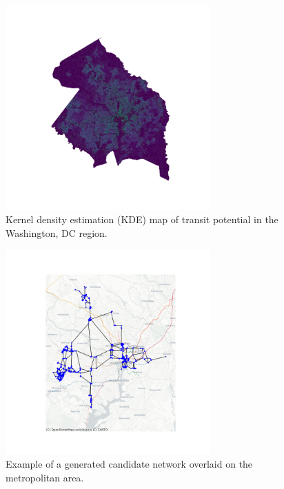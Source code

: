 \documentclass[manuscript]{acmart}
\begin{document}

\begin{figure}[h]
    \centering
    \includegraphics[width=0.7\textwidth]{img/transit_potential.png}
    \caption{Kernel density estimation (KDE) map of transit potential in the Washington, DC region.}
    \label{fig:kde}
\end{figure}


\begin{figure}[h]
    \centering
    \includegraphics[width=0.7\textwidth]{img/network_map.png}
    \caption{Example of a generated candidate network overlaid on the metropolitan area.}
    \label{fig:networkmap}
\end{figure}

\end{document}
